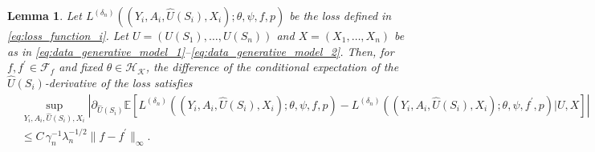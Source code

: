 \documentclass[12pt]{article}
\newtheorem{lemma}{Lemma}%
\newcommand{\E}{\mathbb{E}}
\begin{document}
\begin{lemma}\label{lemma:L_i_derivative_U_diff_f}
    Let $L^{(\delta_n)}((Y_i,A_i,\widehat U(S_i),X_i);\theta,\psi,f,p)$ be the loss defined in \eqref{eq:loss_function_i}. Let $U = (U(S_1),\ldots,U(S_n))$ and $X = (X_1,\ldots,X_n)$ be as in \eqref{eq:data_generative_model_1}--\eqref{eq:data_generative_model_2}. Then, for $f,f^\prime\in\mathcal{F}_f$ and fixed $\theta\in\mathcal{H}_\mathcal{K}$, the difference of the conditional expectation of the $\widehat{U}(S_i)$-derivative of the loss satisfies
    \begin{align*}
        &\sup_{Y_i,A_i,\widehat U(S_i),X_i}\left|\partial_{\widehat U(S_i)} \E\left[L^{(\delta_n)}((Y_i,A_i,\widehat U(S_i),X_i);\theta,\psi,f,p) - L^{(\delta_n)}((Y_i,A_i,\widehat U(S_i),X_i);\theta,\psi,f^\prime,p)\big|U,X\right]\right|\\
        &\leq C\,\gamma_n^{-1}\lambda_n^{-1/2}\|f-f^\prime\|_\infty.
    \end{align*}
\end{lemma}
\end{document}
